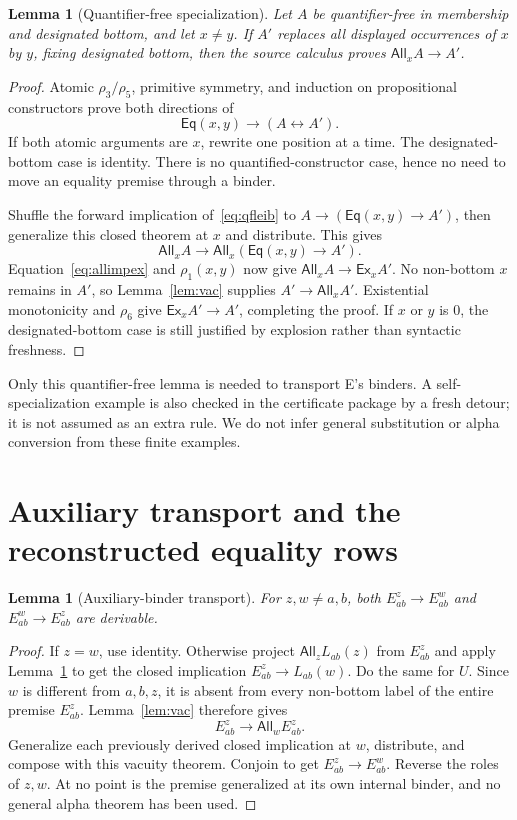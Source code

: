 \documentclass[11pt,letterpaper]{article}
\newtheorem{lemma}[theorem]{Lemma}
\theoremstyle{definition}\newtheorem{definition}[theorem]{Definition}
\theoremstyle{remark}\newtheorem{remark}[theorem]{Remark}
\newcommand{\Eq}{\mathsf{Eq}}
\newcommand{\All}{\mathsf{All}}
\newcommand{\Ex}{\mathsf{Ex}}
\newcommand{\To}{\rightarrow}
\begin{document}
\begin{lemma}[Quantifier-free specialization]\label{lem:qf}
Let $A$ be quantifier-free in membership and designated bottom, and let $x\ne y$. If $A'$ replaces all displayed occurrences of $x$ by $y$, fixing designated bottom, then the source calculus proves $\All_x A\To A'$.
\end{lemma}
\begin{proof}
Atomic $\rho_3/\rho_5$, primitive symmetry, and induction on propositional constructors prove both directions of
\begin{equation}\label{eq:qfleib}
 \Eq(x,y)\To(A\leftrightarrow A').
\end{equation}
If both atomic arguments are $x$, rewrite one position at a time. The designated-bottom case is identity. There is no quantified-constructor case, hence no need to move an equality premise through a binder.

Shuffle the forward implication of~\eqref{eq:qfleib} to $A\To(\Eq(x,y)\To A')$, then generalize this closed theorem at $x$ and distribute. This gives
\[
 \All_x A\To\All_x(\Eq(x,y)\To A').
\]
Equation~\eqref{eq:allimpex} and $\rho_1(x,y)$ now give $\All_x A\To\Ex_x A'$. No non-bottom $x$ remains in $A'$, so Lemma~\ref{lem:vac} supplies $A'\To\All_x A'$. Existential monotonicity and $\rho_6$ give $\Ex_x A'\To A'$, completing the proof. If $x$ or $y$ is 0, the designated-bottom case is still justified by explosion rather than syntactic freshness.
\end{proof}
Only this quantifier-free lemma is needed to transport E's binders. A self-specialization example is also checked in the certificate package by a fresh detour; it is not assumed as an extra rule. We do not infer general substitution or alpha conversion from these finite examples.

\section{Auxiliary transport and the reconstructed equality rows}\label{sec:rows}
\begin{lemma}[Auxiliary-binder transport]\label{lem:transport}
For $z,w\ne a,b$, both $E_{ab}^{z}\To E_{ab}^{w}$ and $E_{ab}^{w}\To E_{ab}^{z}$ are derivable.
\end{lemma}
\begin{proof}
If $z=w$, use identity. Otherwise project $\All_z L_{ab}(z)$ from $E_{ab}^{z}$ and apply Lemma~\ref{lem:qf} to get the closed implication $E_{ab}^{z}\To L_{ab}(w)$. Do the same for $U$. Since $w$ is different from $a,b,z$, it is absent from every non-bottom label of the entire premise $E_{ab}^{z}$. Lemma~\ref{lem:vac} therefore gives
\[
 E_{ab}^{z}\To\All_w E_{ab}^{z}.
\]
Generalize each previously derived closed implication at $w$, distribute, and compose with this vacuity theorem. Conjoin to get $E_{ab}^{z}\To E_{ab}^{w}$. Reverse the roles of $z,w$. At no point is the premise generalized at its own internal binder, and no general alpha theorem has been used.
\end{proof}
\end{document}
